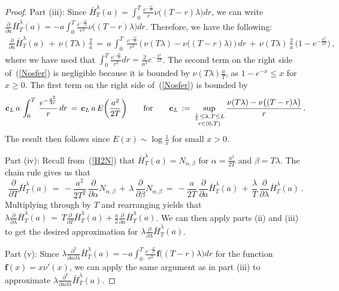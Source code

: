 \documentclass[10pt]{article}
\numberwithin{equation}{section}
\theoremstyle{definition}
\begin{document}
\begin{proof}
\noindent Part (iii): Since  $
   \bar{H}_{ T}^{\lambda}(a)=\int_0^T  \frac{e^{-\frac{a^2}{2r} }}{r}\nu\big( (T-r) \lambda\big)dr$, we can write $ \frac{\partial}{\partial a} \bar{H}^{\lambda}_T(a) =  -a\int_0^T  \frac{e^{-\frac{a^2}{2r} }}{r^2}\nu\big( (T-r) \lambda\big)dr$. Therefore, we have the following:
\begin{align}\label{Nosfer}
 \frac{\partial}{\partial a} \bar{H}^{\lambda}_T(a)\,+\,\nu(T\lambda)\,\frac{2}{a}\,=\,a\,\int_0^T\,  \frac{e^{-\frac{a^2}{2r} }}{r^2}\,\Big(\,\nu( T\lambda)-\nu\big( (T-r)\lambda \big) \,\Big)\, dr \,+\,\nu(T\lambda )\,\frac{2}{a}\,\Big(1- e^{-\frac{a^2}{2T} }  \Big)   \,,
\end{align}
where we have used that $\int_0^T  \frac{e^{-\frac{a^2}{2r} }}{r^2}dr = \frac{2}{a^2}e^{-\frac{a^2}{2T} } $.  The second term on the right side of~(\ref{Nosfer}) is negligible because it is bounded by $\nu(T\lambda )\frac{a}{T}  $, as  $1-e^{-x} \leq x$ for $x\geq 0$.  The first term on the right side of~(\ref{Nosfer}) is bounded by 
\begin{align*}
\mathbf{c}_L \,a\,\int_0^T \, \frac{e^{-\frac{a^2}{2r} }}{r}\, dr  \,=\, \mathbf{c}_L \,a\,E\bigg(\frac{a^2 }{ 2T }  \bigg)
 \hspace{.7cm}\text{for}\hspace{.7cm}\mathbf{c}_L\, :=\,\sup_{\substack{ \frac{1}{L} \leq  \lambda , T\leq L  \\  r\in (0,T)   }  } \frac{\nu(T\lambda )-\nu\big( (T-r)\lambda\big) }{r}\,.
\end{align*}
The result then follows since $E(x)\sim \log \frac{1}{x}$ for small $x>0$.\vspace{.2cm}

\noindent Part (iv):  Recall from~(\ref{H2N}) that $ \bar{H}^{\lambda}_T(a)=N_{\alpha,\beta}  $ for $\alpha=\frac{a^2}{2T}$ and $\beta=T\lambda $. The chain rule gives us that
$$  \frac{\partial}{\partial T} \bar{H}^{\lambda}_T(a)\,=\,-\frac{ a^2 }{ 2T^2 } \,\frac{\partial}{\partial \alpha }N_{\alpha, \beta}\,+\, \lambda \,\frac{\partial}{\partial \beta }N_{\alpha, \beta}\,=\,-\frac{a}{2T} \,\frac{\partial}{\partial a} \bar{H}^{\lambda}_T(a) \,+\,\frac{\lambda}{T} \,\frac{\partial}{\partial \lambda } \bar{H}^{\lambda}_T(a) \,.$$
Multiplying through by $T$ and rearranging yields that $\lambda \frac{\partial}{\partial \lambda } \bar{H}^{\lambda}_T(a)\,=\,T\frac{\partial}{\partial T} \bar{H}^{\lambda}_T(a)+ \frac{a}{2}  \frac{\partial}{\partial a} \bar{H}^{\lambda}_T(a) $.  We can then apply parts (ii) and (iii) to get the desired approximation for $\lambda \frac{\partial}{\partial \lambda} \bar{H}^{\lambda}_T(a)$. \vspace{.2cm}




\noindent Part (v): Since $ \lambda \frac{\partial^2}{\partial a \partial \lambda } \bar{H}^{\lambda}_T(a) =  -a\int_0^T  \frac{e^{-\frac{a^2}{2r} }}{r^2} \mathbf{f}\big( (T-r)\lambda \big)dr$ for the function $\mathbf{f}(x)=x\nu'(x)$, we  can apply the same argument as in part (iii) to approximate  $ \lambda \frac{\partial^2}{\partial a \partial \lambda } \bar{H}^{\lambda}_T(a)$.
\end{proof}
\end{document}
